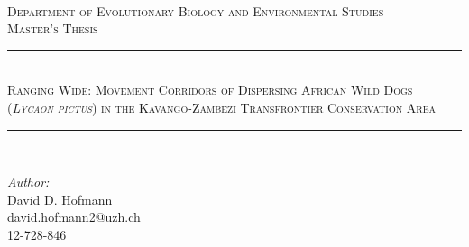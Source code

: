 \documentclass[abstract=on,10pt,a4paper,bibliography=totocnumbered]{scrartcl}
\begin{document}


\begin{titlepage}

\newcommand{\HRule}{\rule{\linewidth}{0.5mm}}

\center


\textsc{\LARGE  }\\[1.5cm]

\textsc{\Large Department of Evolutionary Biology and Environmental
Studies}\\[0.5cm]

\textsc{\large Master's Thesis}\\[0.5cm]

\doublespacing
\HRule \\[0.4cm]

{\textsc{ \LARGE Ranging Wide: Movement Corridors of Dispersing African Wild
Dogs (\textit{Lycaon pictus}) in the Kavango-Zambezi Transfrontier Conservation
Area}}\\[0.4cm]

\HRule \\[1.5cm]
\singlespacing


\begin{minipage}{0.4\textwidth}
\begin{flushleft} \large

\emph{Author:}\\
David D. Hofmann\\
david.hofmann2@uzh.ch\\
12-728-846

\end{flushleft}
\end{minipage}
~
\begin{minipage}{0.4\textwidth}
\begin{flushright} \large


\end{flushright}
\end{minipage}
\end{titlepage}
\end{document}
